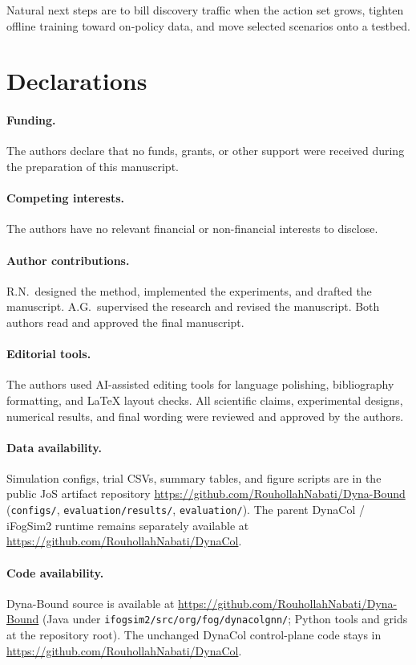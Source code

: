 \documentclass[11pt,a4paper]{article}
\begin{document}
Natural next steps are to bill discovery traffic when the action set grows,
tighten offline training toward on-policy data, and move selected scenarios onto
a testbed.

\section*{Declarations}

\paragraph{Funding.}
The authors declare that no funds, grants, or other support were received
during the preparation of this manuscript.

\paragraph{Competing interests.}
The authors have no relevant financial or non-financial interests to disclose.

\paragraph{Author contributions.}
R.N.\ designed the method, implemented the experiments, and drafted the
manuscript. A.G.\ supervised the research and revised the manuscript. Both
authors read and approved the final manuscript.

\paragraph{Editorial tools.}
The authors used AI-assisted editing tools for language polishing, bibliography
formatting, and LaTeX layout checks. All scientific claims, experimental
designs, numerical results, and final wording were reviewed and approved by the
authors.

\paragraph{Data availability.}
Simulation configs, trial CSVs, summary tables, and figure scripts are in the
public JoS artifact repository
\url{https://github.com/RouhollahNabati/Dyna-Bound}
(\texttt{configs/}, \texttt{evaluation/results/}, \texttt{evaluation/}).
The parent DynaCol / iFogSim2 runtime remains separately available at
\url{https://github.com/RouhollahNabati/DynaCol}.

\paragraph{Code availability.}
Dyna-Bound source is available at
\url{https://github.com/RouhollahNabati/Dyna-Bound}
(Java under \texttt{ifogsim2/src/org/fog/dynacolgnn/}; Python tools and grids
at the repository root). The unchanged DynaCol control-plane code stays in
\url{https://github.com/RouhollahNabati/DynaCol}.
\end{document}
